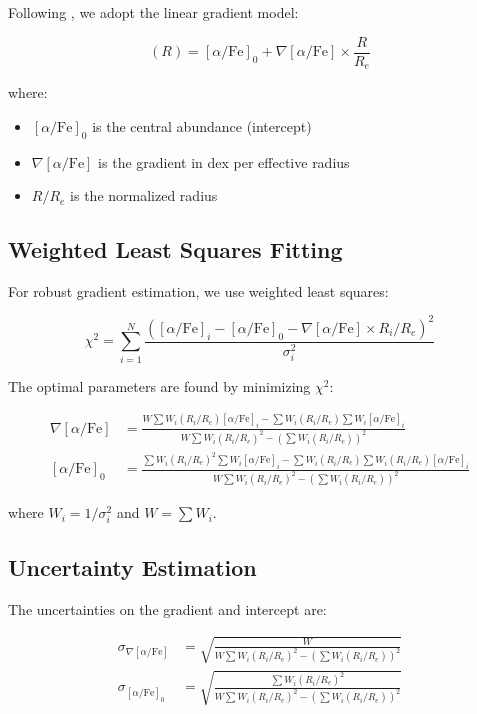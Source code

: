 \documentclass[11pt,a4paper]{article}
\begin{document}
Following \citet{Liu2016}, we adopt the linear gradient model:

\begin{equation}
[\alpha/\text{Fe}](R) = [\alpha/\text{Fe}]_0 + \nabla[\alpha/\text{Fe}] \times \frac{R}{R_e}
\end{equation}

where:
\begin{itemize}
\item $[\alpha/\text{Fe}]_0$ is the central abundance (intercept)
\item $\nabla[\alpha/\text{Fe}]$ is the gradient in dex per effective radius
\item $R/R_e$ is the normalized radius
\end{itemize}

\subsection{Weighted Least Squares Fitting}

For robust gradient estimation, we use weighted least squares:

\begin{equation}
\chi^2 = \sum_{i=1}^{N} \frac{([\alpha/\text{Fe}]_i - [\alpha/\text{Fe}]_0 - \nabla[\alpha/\text{Fe}] \times R_i/R_e)^2}{\sigma_i^2}
\end{equation}

The optimal parameters are found by minimizing $\chi^2$:

\begin{align}
\nabla[\alpha/\text{Fe}] &= \frac{W \sum W_i (R_i/R_e) [\alpha/\text{Fe}]_i - \sum W_i (R_i/R_e) \sum W_i [\alpha/\text{Fe}]_i}{W \sum W_i (R_i/R_e)^2 - (\sum W_i (R_i/R_e))^2} \\
[\alpha/\text{Fe}]_0 &= \frac{\sum W_i (R_i/R_e)^2 \sum W_i [\alpha/\text{Fe}]_i - \sum W_i (R_i/R_e) \sum W_i (R_i/R_e) [\alpha/\text{Fe}]_i}{W \sum W_i (R_i/R_e)^2 - (\sum W_i (R_i/R_e))^2}
\end{align}

where $W_i = 1/\sigma_i^2$ and $W = \sum W_i$.

\subsection{Uncertainty Estimation}

The uncertainties on the gradient and intercept are:

\begin{align}
\sigma_{\nabla[\alpha/\text{Fe}]} &= \sqrt{\frac{W}{W \sum W_i (R_i/R_e)^2 - (\sum W_i (R_i/R_e))^2}} \\
\sigma_{[\alpha/\text{Fe}]_0} &= \sqrt{\frac{\sum W_i (R_i/R_e)^2}{W \sum W_i (R_i/R_e)^2 - (\sum W_i (R_i/R_e))^2}}
\end{align}
\end{document}
